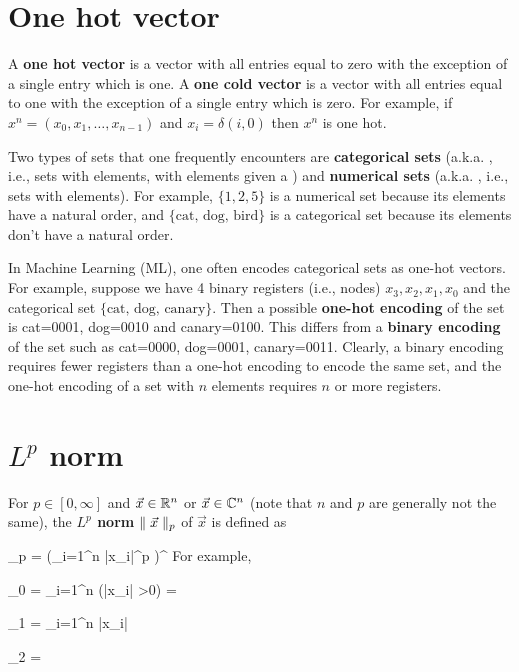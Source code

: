\section{One hot vector}
A {\bf one hot  vector}
is a vector with all entries
equal to zero with
the exception of a single entry which is one.
A {\bf one cold vector}  is a vector with all entries
equal to one with the exception of  a
single entry which is zero.
For example, if $x^n=(x_0, x_1, \ldots,
x_{n-1})$ and
$x_i=\delta(i,0)$ then $x^n$ is one hot.

Two types of
sets that one frequently encounters
are {\bf categorical sets} (a.k.a. , i.e.,
sets with  elements, with elements given a )
and {\bf numerical sets} (a.k.a. , i.e., sets
 with 
elements).
For example, $\{1,2,5\}$ is a numerical set
because its elements have a natural order,
and $\{\text{cat, dog, bird}\}$ is a  categorical set
because its elements don't have a natural order.

In Machine Learning (ML),
one often encodes categorical sets as one-hot vectors.
For example, suppose we have 4 binary registers (i.e., nodes)
 $x_3, x_2,x_1, x_0$
and  the categorical set $\{\text{cat, dog, canary}\}$.
Then a possible {\bf one-hot encoding}
of the set
is cat=0001, dog=0010 and canary=0100.
This differs from
a {\bf binary encoding} of the set such as
cat=0000, dog=0001, canary=0011.
Clearly, a binary encoding requires
fewer registers than a one-hot
encoding to
encode the same set,
and the one-hot encoding
of a set with $n$ elements requires
$n$ or more registers.

\section{$L^p$  norm}
\label{sec-p-norm}

For $p\in [0, \infty]$
and $\vec{x}\in{ \mathbb{R}}^n$ or $\vec{x}\in{ \mathbb{C}}^n$ (note that $n$ and $p$ are generally not the same),  
the {\bf $L^p$ norm} $\parallel\vec{x}\parallel_p$ of $\vec{x}$
is defined as
 
\beq
{}_p 
 = \left(\sum_{i=1}^n |x_i|^p
\right)^{}
\eeq
For example,


\beq
{}_0 = \sum_{i=1}^n \indi(|x_i| >0) = 
\eeq

\beq
{}_1 = \sum_{i=1}^n |x_i|
\eeq

\beq
{}_2 = 
\eeq


